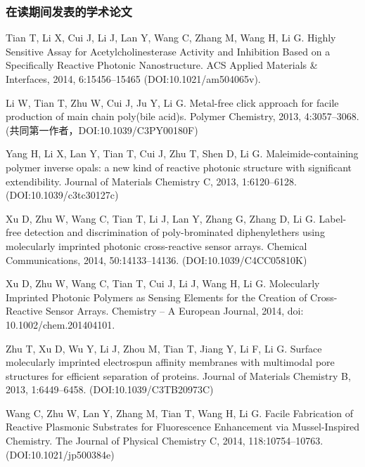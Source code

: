 \documentclass{beamer}
\begin{document}
\begin{frame}
  \frametitle{在读期间发表的学术论文}
  {
  \scriptsize
  \item Tian T, Li X, Cui J, Li J, Lan Y, Wang C, Zhang M, Wang H, Li G. Highly Sensitive Assay for Acetylcholinesterase Activity and Inhibition Based on a Specifically Reactive Photonic Nanostructure. ACS Applied Materials & Interfaces, 2014, 6:15456–15465 (DOI:10.1021/am504065v). 
  
  \item Li W, Tian T, Zhu W, Cui J, Ju Y, Li G. Metal-free click approach for facile production of main chain poly(bile acid)s.  Polymer Chemistry, 2013, 4:3057–3068. (共同第一作者，DOI:10.1039/C3PY00180F)
  
  \item Yang H, Li X, Lan Y, Tian T, Cui J, Zhu T, Shen D, Li G. Maleimide-containing polymer inverse opals: a new kind of reactive photonic structure with significant extendibility. Journal of Materials Chemistry C, 2013, 1:6120–6128. (DOI:10.1039/c3tc30127c)
  
  \item Xu D, Zhu W, Wang C, Tian T, Li J, Lan Y, Zhang G, Zhang D, Li G. Label-free detection and discrimination of poly-brominated diphenylethers using molecularly imprinted photonic cross-reactive sensor arrays. Chemical Communications, 2014, 50:14133–14136. (DOI:10.1039/C4CC05810K)
  
  \item Xu D, Zhu W, Wang C, Tian T, Cui J, Li J, Wang H, Li G. Molecularly Imprinted Photonic Polymers as Sensing Elements for the Creation of Cross-Reactive Sensor Arrays. Chemistry – A European Journal, 2014, doi: 10.1002/chem.201404101.
  
  \item Zhu T, Xu D, Wu Y, Li J, Zhou M, Tian T, Jiang Y, Li F, Li G. Surface molecularly imprinted electrospun affinity membranes with multimodal pore structures for efficient separation of proteins.  Journal of Materials Chemistry B, 2013, 1:6449–6458. (DOI:10.1039/C3TB20973C)
  
  \item Wang C, Zhu W, Lan Y, Zhang M, Tian T, Wang H, Li G. Facile Fabrication of Reactive Plasmonic Substrates for Fluorescence Enhancement via Mussel-Inspired Chemistry.  The Journal of Physical Chemistry C, 2014, 118:10754–10763. (DOI:10.1021/jp500384e)

  }
\end{frame}
\end{document}
